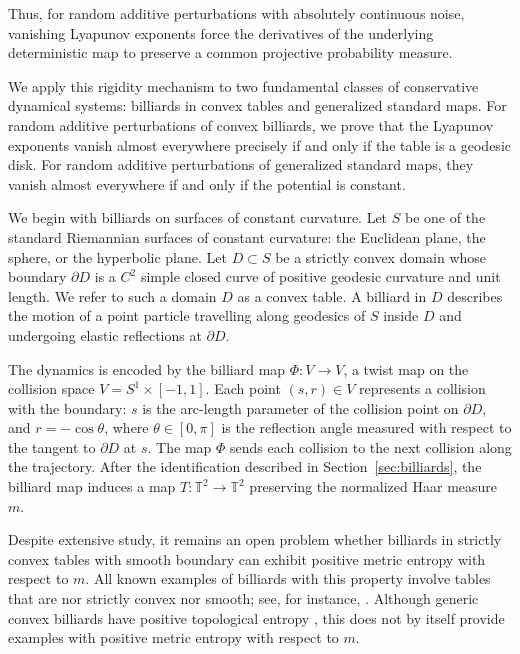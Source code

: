 \documentclass[a4paper,12pt,reqno]{amsart}
\numberwithin{equation}{section}
\newcommand{\Tt}{{\mathbb{T}}}
\begin{document}
Thus, for random additive perturbations with absolutely continuous noise, vanishing Lyapunov exponents force the derivatives of the underlying deterministic map to preserve a common projective probability measure. 

We apply this rigidity mechanism to two fundamental classes of conservative dynamical systems: billiards in convex tables and generalized standard maps. For random additive perturbations of convex billiards, we prove that the Lyapunov exponents vanish almost everywhere precisely if and only if the table is a geodesic disk. For random additive perturbations of generalized standard maps, they vanish almost everywhere if and only if the potential is constant.

We begin with billiards on surfaces of constant curvature. Let $S$ be one of the standard Riemannian surfaces of constant curvature: the Euclidean plane, the sphere, or the hyperbolic plane. Let $D\subset S$ be a strictly convex domain whose boundary $\partial D$ is a $C^2$ simple closed curve of positive geodesic curvature and unit length. We refer to such a domain $D$ as a convex table. A billiard in $D$ describes the motion of a point particle travelling along geodesics of $S$ inside $D$ and undergoing elastic reflections at $\partial D$.

The dynamics is encoded by the billiard map $\Phi\colon V\to V$, a twist map on the collision space $V=S^1\times[-1,1]$. Each point $(s,r)\in V$ represents a collision with the boundary: $s$ is the arc-length parameter of the collision point on $\partial D$, and $r=-\cos\theta$, where $\theta\in[0,\pi]$ is the reflection angle measured with respect to the tangent to $\partial D$ at $s$. The map $\Phi$ sends each collision to the next collision along the trajectory. After the identification described in Section~\ref{sec:billiards}, the billiard map induces a map $T\colon\Tt^2\to\Tt^2$ preserving the normalized Haar measure $m$.

Despite extensive study, it remains an open problem whether billiards in strictly convex tables with smooth boundary can exhibit positive metric entropy with respect to $m$. All known examples of billiards with this property involve tables that are nor strictly convex nor smooth; see, for instance, \cite{Bunimovich:79,Wojtkowski:86,Donnay:91,Markarian:94,Gutkin:99}. Although generic convex billiards have positive topological entropy \cite{BessaDelMagnoLopesDiasGaivaoTorres24,Cheng2004400,ZHANG2017793}, this does not by itself provide examples with positive metric entropy with respect to $m$.
\end{document}
